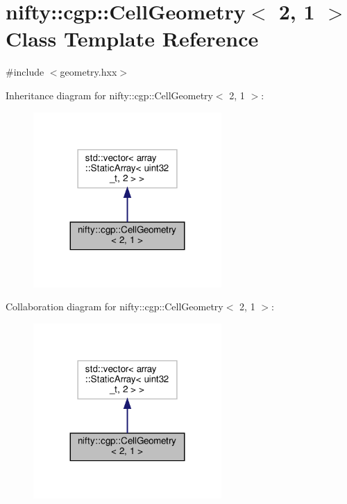 \hypertarget{classnifty_1_1cgp_1_1CellGeometry_3_012_00_011_01_4}{}\section{nifty\+:\+:cgp\+:\+:Cell\+Geometry$<$ 2, 1 $>$ Class Template Reference}
\label{classnifty_1_1cgp_1_1CellGeometry_3_012_00_011_01_4}


{\ttfamily \#include $<$geometry.\+hxx$>$}



Inheritance diagram for nifty\+:\+:cgp\+:\+:Cell\+Geometry$<$ 2, 1 $>$\+:
\nopagebreak
\begin{figure}[H]
\begin{center}
\leavevmode
\includegraphics[width=203pt]{classnifty_1_1cgp_1_1CellGeometry_3_012_00_011_01_4__inherit__graph}
\end{center}
\end{figure}


Collaboration diagram for nifty\+:\+:cgp\+:\+:Cell\+Geometry$<$ 2, 1 $>$\+:
\nopagebreak
\begin{figure}[H]
\begin{center}
\leavevmode
\includegraphics[width=203pt]{classnifty_1_1cgp_1_1CellGeometry_3_012_00_011_01_4__coll__graph}
\end{center}
\end{figure}
